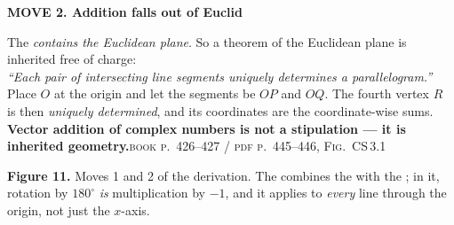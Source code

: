 \vspace{13pt}
\noindent\begin{minipage}[t]{0.42\textwidth}
\vspace{0pt}
\textbf{\color{csC}\textsf{MOVE 2.}\; Addition falls out of Euclid}\\[4pt]
\end{minipage}\hfill
\begin{minipage}[t]{0.545\textwidth}
\vspace{12pt}\footnotesize\color{slate}
The  \emph{contains the Euclidean plane}. So a theorem of the Euclidean
plane is inherited free of charge:\\[4pt]
\textit{``Each pair of intersecting line segments uniquely determines a parallelogram.''}\\[4pt]
Place $O$ at the origin and let the segments be $OP$ and $OQ$. The fourth vertex $R$ is then
\emph{uniquely determined}, and its coordinates are the coordinate-wise sums.\\[5pt]
\textcolor{csC}{\textbf{Vector addition of complex numbers is not a stipulation --- it is inherited
geometry.}}\;\textsc{\scriptsize book p.~426--427 / pdf p.~445--446, Fig.~CS\,3.1}
\end{minipage}

\vspace{10pt}
\begin{center}\begin{minipage}{0.93\textwidth}\footnotesize\color{slate}
\textbf{Figure 11.}\; Moves 1 and 2 of the derivation. The  combines the
 with the ; in it, rotation by
$180^{\circ}$ \emph{is} multiplication by $-1$, and it applies to \emph{every} line through the
origin, not just the $x$-axis.
\end{minipage}\end{center}

